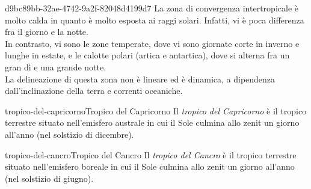 \documentclass[preview]{standalone}
\begin{document}
\begin{snippet}{d9bc89bb-32ae-4742-9a2f-82048d4199d7}
    La zona di convergenza intertropicale è molto calda in quanto è molto esposta ai raggi solari.
    Infatti, vi è poca differenza fra il giorno e la notte.
    \\
    In contrasto, vi sono le zone temperate, dove vi sono giornate corte in inverno e lunghe
    in estate, e le calotte polari (artica e antartica), dove si alterna fra un gran dì e una grande notte.
    \\
    La delineazione di questa zona non è lineare ed è dinamica, a dipendenza dall'inclinazione della terra
    e correnti oceaniche.
\end{snippet}

\begin{snippetdefinition}{tropico-del-capricorno}{Tropico del Capricorno}
    Il \textit{tropico del Capricorno} è il tropico terrestre
    situato nell'emisfero australe in cui il Sole
    culmina allo zenit un giorno all'anno (nel solstizio di dicembre).
\end{snippetdefinition}

\begin{snippetdefinition}{tropico-del-cancro}{Tropico del Cancro}
    Il \textit{tropico del Cancro} è il tropico terrestre
    situato nell'emisfero boreale in cui il Sole culmina
    allo zenit un giorno all'anno (nel solstizio di giugno).
\end{snippetdefinition}


\end{document}
